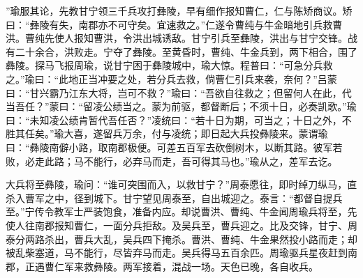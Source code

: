 ”瑜服其论，先教甘宁领三千兵攻打彝陵，早有细作报知曹仁，仁与陈矫商议。矫曰：“彝陵有失，南郡亦不可守矣。宜速救之。”仁遂令曹纯与牛金暗地引兵救曹洪。曹纯先使人报知曹洪，令洪出城诱敌。甘宁引兵至彝陵，洪出与甘宁交锋。战有二十余合，洪败走。宁夺了彝陵。至黄昏时，曹纯、牛金兵到，两下相合，围了彝陵。探马飞报周瑜，说甘宁困于彝陵城中，瑜大惊。程普曰：“可急分兵救之。”瑜曰：“此地正当冲要之处，若分兵去救，倘曹仁引兵来袭，奈何？”吕蒙曰：“甘兴霸乃江东大将，岂可不救？”瑜曰：“吾欲自往救之；但留何人在此，代当吾任？”蒙曰：“留凌公绩当之。蒙为前驱，都督断后；不须十日，必奏凯歌。”瑜曰：“未知凌公绩肯暂代吾任否？”凌统曰：“若十日为期，可当之；十日之外，不胜其任矣。”瑜大喜，遂留兵万余，付与凌统；即日起大兵投彝陵来。蒙谓瑜曰：“彝陵南僻小路，取南郡极便。可差五百军去砍倒树木，以断其路。彼军若败，必走此路；马不能行，必弃马而走，吾可得其马也。”瑜从之，差军去讫。

大兵将至彝陵，瑜问：“谁可突围而入，以救甘宁？”周泰愿往，即时绰刀纵马，直杀入曹军之中，径到城下。甘宁望见周泰至，自出城迎之。泰言：“都督自提兵至。”宁传令教军士严装饱食，准备内应。却说曹洪、曹纯、牛金闻周瑜兵将至，先使人往南郡报知曹仁，一面分兵拒敌。及吴兵至，曹兵迎之。比及交锋，甘宁、周泰分两路杀出，曹兵大乱，吴兵四下掩杀。曹洪、曹纯、牛金果然投小路而走；却被乱柴塞道，马不能行，尽皆弃马而走。吴兵得马五百余匹。周瑜驱兵星夜赶到南郡，正遇曹仁军来救彝陵。两军接着，混战一场。天色已晚，各自收兵。

